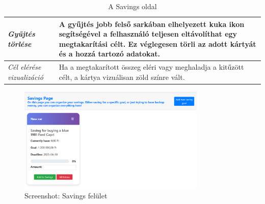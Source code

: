 \begin{itemize}
\begin{table}[H]
\begin{tabular}{ | m{} | m{} | }
			\hline
			
			\emph{Gyűjtés törlése} &
			A gyűjtés jobb felső sarkában elhelyezett kuka ikon segítségével a felhasználó teljesen eltávolíthat egy megtakarítási célt. Ez véglegesen törli az adott kártyát és a hozzá tartozó adatokat. \\
			
			\hline
			
			\emph{Cél elérése vizualizáció} &
			Ha a megtakarított összeg eléri vagy meghaladja a kitűzött célt, a kártya vizuálisan zöld színre vált. \\
			
			\hline
		\end{tabular}
		\caption{A Savings oldal}
		\label{tab:savings}
	\end{table}
	\begin{figure}[H]
		\centering
		\includegraphics[height=190px]{img/savings}
		\caption{Screenshot: Savings felület}
		\label{fig:savings}
	\end{figure}
\end{itemize}


